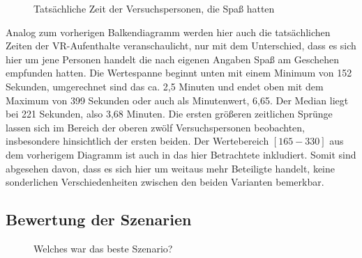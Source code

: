 \documentclass{Paper}
\begin{document}
		\begin{figure}[H]
  \caption{Tatsächliche Zeit der Versuchspersonen, die Spaß hatten}
  \label{ZeitSpass}
	\end{figure}
	Analog zum vorherigen Balkendiagramm werden hier auch die tatsächlichen Zeiten der VR-Aufenthalte veranschaulicht, nur mit dem Unterschied, dass es sich hier um jene Personen handelt die nach eigenen Angaben Spaß am Geschehen empfunden hatten.
Die Wertespanne beginnt unten mit einem Minimum von 152 Sekunden, umgerechnet sind das ca. 2,5 Minuten und endet oben mit dem Maximum von 399 Sekunden oder auch als Minutenwert, 6,65. Der Median liegt bei 221 Sekunden, also 3,68 Minuten. Die ersten größeren zeitlichen Sprünge lassen sich im Bereich der oberen zwölf Versuchspersonen beobachten, insbesondere hinsichtlich der ersten beiden. Der Wertebereich $[165-330]$ aus dem vorherigem Diagramm ist auch in das hier Betrachtete inkludiert. Somit sind abgesehen davon, dass es sich hier um weitaus mehr Beteiligte handelt, keine sonderlichen Verschiedenheiten zwischen den beiden Varianten bemerkbar.
	
\newpage

\subsection{Bewertung der Szenarien}
	\begin{figure}[ht]
\caption{Welches war das beste Szenario?}
\label{SzenarioGut}
\end{figure}
\end{document}
